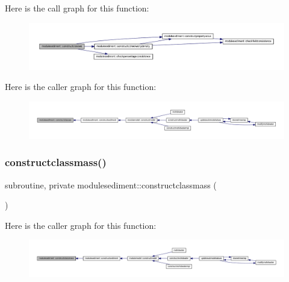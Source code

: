 Here is the call graph for this function\+:\nopagebreak
\begin{figure}[H]
\begin{center}
\leavevmode
\includegraphics[width=350pt]{namespacemodulesediment_aab617a4a3f8db9a8c86241473054067d_cgraph}
\end{center}
\end{figure}
Here is the caller graph for this function\+:\nopagebreak
\begin{figure}[H]
\begin{center}
\leavevmode
\includegraphics[width=350pt]{namespacemodulesediment_aab617a4a3f8db9a8c86241473054067d_icgraph}
\end{center}
\end{figure}
\mbox{\label{namespacemodulesediment_ae0fc128b081e1181c0df22dd4822b65d}} 
\subsubsection{\texorpdfstring{constructclassmass()}{constructclassmass()}}
{\footnotesize\ttfamily subroutine, private modulesediment\+::constructclassmass (\begin{DoxyParamCaption}{ }\end{DoxyParamCaption})\hspace{0.3cm}{\ttfamily [private]}}

Here is the caller graph for this function\+:\nopagebreak
\begin{figure}[H]
\begin{center}
\leavevmode
\includegraphics[width=350pt]{namespacemodulesediment_ae0fc128b081e1181c0df22dd4822b65d_icgraph}
\end{center}
\end{figure}
\mbox{\label{namespacemodulesediment_adc3a3328a47ba86ef363852158194846}} 
